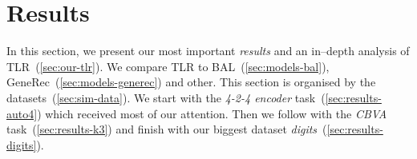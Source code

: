

\section{Results} 
\label{sec:results} 

In this section, we present our most important \emph{results} and an in--depth analysis of TLR~(\ref{sec:our-tlr}). We compare TLR to BAL~(\ref{sec:models-bal}), GeneRec~(\ref{sec:models-generec}) and other. This section is organised by the datasets~(\ref{sec:sim-data}). We start with the \emph{4-2-4 encoder} task~(\ref{sec:results-auto4}) which received most of our attention. Then we follow with the \emph{CBVA} task~(\ref{sec:results-k3}) and finish with our biggest dataset \emph{digits}~(\ref{sec:results-digits}). 

 

 

 

  

